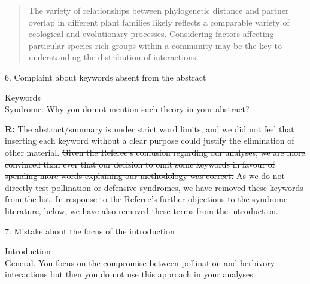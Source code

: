 \documentclass[12pt]{letter}
\newenvironment{refquote}{\bigskip \begin{it}}{\end{it}\smallskip}
\providecommand{\DIFadd}[1]{{\protect\color{blue}\uwave{#1}}} %
\providecommand{\DIFdel}[1]{{\protect\color{red}\sout{#1}}}                      %
\providecommand{\DIFaddbegin}{} %
\providecommand{\DIFaddend}{} %
\providecommand{\DIFdelbegin}{} %
\providecommand{\DIFdelend}{} %
\newcommand{\DIFscaledelfig}{0.5}
\newlength{\DIFdelgraphicswidth} %
\newlength{\DIFdelgraphicsheight} %
\newcommand{\DIFaddincludegraphics}[2][]{{\color{blue}\fbox{\DIFOincludegraphics[#1]{#2}}}} %
\newcommand{\DIFdelincludegraphics}[2][]{%
\sbox{\DIFdelgraphicsbox}{\DIFOincludegraphics[#1]{#2}}%
\settoboxwidth{\DIFdelgraphicswidth}{\DIFdelgraphicsbox} %
\settoboxtotalheight{\DIFdelgraphicsheight}{\DIFdelgraphicsbox} %
\scalebox{\DIFscaledelfig}{%
\parbox[b]{\DIFdelgraphicswidth}{\usebox{\DIFdelgraphicsbox}\\[-\baselineskip] \rule{\DIFdelgraphicswidth}{0em}}\llap{\resizebox{\DIFdelgraphicswidth}{\DIFdelgraphicsheight}{%
\setlength{\unitlength}{\DIFdelgraphicswidth}%
\begin{picture}(1,1)%
\thicklines\linethickness{2pt} %
{\color[rgb]{1,0,0}\put(0,0){\framebox(1,1){}}}%
{\color[rgb]{1,0,0}\put(0,0){\line( 1,1){1}}}%
{\color[rgb]{1,0,0}\put(0,1){\line(1,-1){1}}}%
\end{picture}%
}\hspace*{3pt}}} %
} %
\DeclareRobustCommand{\DIFaddbegin}{\DIFOaddbegin \let\includegraphics\DIFaddincludegraphics} %
\DeclareRobustCommand{\DIFaddend}{\DIFOaddend \let\includegraphics\DIFOincludegraphics} %
\DeclareRobustCommand{\DIFdelbegin}{\DIFOdelbegin \let\includegraphics\DIFdelincludegraphics} %
\DeclareRobustCommand{\DIFdelend}{\DIFOaddend \let\includegraphics\DIFOincludegraphics} %
\begin{document}
		\begin{quotation}
		    \item The variety of relationships between phylogenetic distance and partner overlap in different plant families likely reflects a comparable variety of ecological and evolutionary processes. Considering factors affecting particular species-rich groups within a community may be the key to understanding the distribution of interactions.
		\end{quotation}


	6. Complaint about keywords absent from the abstract

		\begin{refquote}
		Keywords\\
		Syndrome:  Why you do not mention such theory in your abstract?
		\end{refquote}


		\textbf{R:} The abstract/summary is under strict word limits, and we did not feel that inserting each keyword without a clear purpose could justify the elimination of other material.
		\DIFdelbegin \DIFdel{Given the Referee's confusion regarding our analyses, we are more convinced than ever that our decision to omit some keywords in favour of spending more words explaining our methodology was correct. }\DIFdelend %
		As we do not directly test pollination or defensive syndromes, we have removed these keywords from the list. In response to the Referee's further objections to the syndrome literature, below, we have also removed these terms from the introduction.


	7. \DIFdelbegin \DIFdel{Mistake about the }\DIFdelend \DIFaddbegin \DIFadd{The }\DIFaddend focus of the introduction

		\begin{refquote}
		Introduction\\
		General. You focus on the compromise between pollination and herbivory interactions but then you do not use this approach in your analyses.
		\end{refquote}
\end{document}
